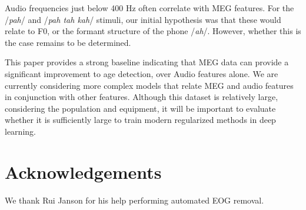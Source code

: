 \documentclass[utf8]{frontiersSCNS} %
\begin{document}
Audio frequencies just below 400 Hz often correlate with MEG features. For the /{\em pah}/ and /{\em pah tah kah}/ stimuli, our initial hypothesis was that these would relate to F0, or the formant structure of the phone /{\em ah}/. However, whether this is the case remains to be determined.


This paper provides a strong baseline indicating that MEG data can provide a significant improvement to age detection, over Audio features alone. We are currently considering more complex models that relate MEG and audio features in conjunction with other features. Although this dataset is relatively large, considering the population and equipment, it will be important to evaluate whether it is sufficiently large to train modern regularized methods in deep learning.

\section{Acknowledgements}

We thank Rui Janson for his help performing automated EOG removal.






\end{document}
